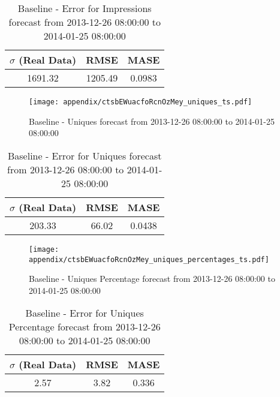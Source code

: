 \begin{table}[H]
\centering
\footnotesize
\begin{tabular}{ccc}
$\sigma$ (Real Data) & RMSE & MASE   \\ \hline
1691.32 & 1205.49 & 0.0983 \\
\end{tabular}

\vspace{0.5cm}

\caption[]{
Baseline - Error for Impressions forecast from 2013-12-26 08:00:00 to 2014-01-25 08:00:00}
\end{table}

\begin{figure}[H] \begin{center} \leavevmode
\texttt{[image: appendix/ctsbEWuacfoRcnOzMey\_uniques\_ts.pdf]} \caption[]{
Baseline - Uniques forecast from 2013-12-26 08:00:00 to 2014-01-25 08:00:00} \label{fig:appendix/ctsbEWuacfoRcnOzMey_uniques_ts.pdf} \end{center}
\end{figure}

\begin{table}[H]
\centering
\footnotesize
\begin{tabular}{ccc}
$\sigma$ (Real Data) & RMSE & MASE   \\ \hline
203.33 & 66.02 & 0.0438 \\
\end{tabular}

\vspace{0.5cm}

\caption[]{
Baseline - Error for Uniques forecast from 2013-12-26 08:00:00 to 2014-01-25 08:00:00}
\end{table}

\begin{figure}[H] \begin{center} \leavevmode
\texttt{[image: appendix/ctsbEWuacfoRcnOzMey\_uniques\_percentages\_ts.pdf]} \caption[]{
Baseline - Uniques Percentage forecast from 2013-12-26 08:00:00 to 2014-01-25 08:00:00} \label{fig:appendix/ctsbEWuacfoRcnOzMey_uniques_percentages_ts.pdf} \end{center}
\end{figure}

\begin{table}[H]
\centering
\footnotesize
\begin{tabular}{ccc}
$\sigma$ (Real Data) & RMSE & MASE   \\ \hline
2.57 & 3.82 & 0.336 \\
\end{tabular}

\vspace{0.5cm}

\caption[]{
Baseline - Error for Uniques Percentage forecast from 2013-12-26 08:00:00 to 2014-01-25 08:00:00}
\end{table}

